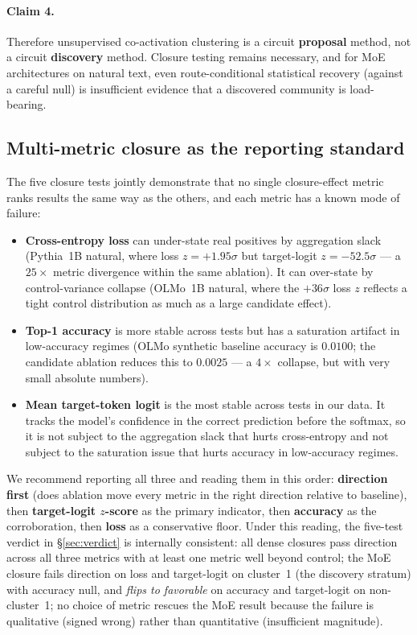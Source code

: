 \documentclass[11pt]{article}
\begin{document}
\paragraph{Claim 4.} Therefore unsupervised co-activation clustering is a
circuit \textbf{proposal} method, not a circuit \textbf{discovery} method.
Closure testing remains necessary, and for MoE architectures on natural
text, even route-conditional statistical recovery (against a careful null)
is insufficient evidence that a discovered community is load-bearing.

\subsection{Multi-metric closure as the reporting standard}

The five closure tests jointly demonstrate that no single closure-effect
metric ranks results the same way as the others, and each metric has a
known mode of failure:

\begin{itemize}
\item \textbf{Cross-entropy loss} can under-state real positives by
  aggregation slack (Pythia~1B natural, where loss $z = +1.95\sigma$ but
  target-logit $z = -52.5\sigma$ --- a $25\times$ metric divergence within
  the same ablation). It can over-state by control-variance collapse
  (OLMo~1B natural, where the $+36\sigma$ loss $z$ reflects a tight
  control distribution as much as a large candidate effect).

\item \textbf{Top-1 accuracy} is more stable across tests but has a
  saturation artifact in low-accuracy regimes (OLMo synthetic baseline
  accuracy is $0.0100$; the candidate ablation reduces this to $0.0025$
  --- a $4\times$ collapse, but with very small absolute numbers).

\item \textbf{Mean target-token logit} is the most stable across tests in
  our data. It tracks the model's confidence in the correct prediction
  before the softmax, so it is not subject to the aggregation slack that
  hurts cross-entropy and not subject to the saturation issue that hurts
  accuracy in low-accuracy regimes.
\end{itemize}

We recommend reporting all three and reading them in this order:
\textbf{direction first} (does ablation move every metric in the right
direction relative to baseline), then \textbf{target-logit $z$-score} as
the primary indicator, then \textbf{accuracy} as the corroboration, then
\textbf{loss} as a conservative floor. Under this reading, the five-test
verdict in \S\ref{sec:verdict} is internally consistent: all dense
closures pass direction across all three metrics with at least one metric
well beyond control; the MoE closure fails direction on loss and
target-logit on cluster~1 (the discovery stratum) with accuracy null, and
\emph{flips to favorable} on accuracy and target-logit on non-cluster~1;
no choice of metric rescues the MoE result because the failure is
qualitative (signed wrong) rather than quantitative (insufficient
magnitude).
\end{document}
